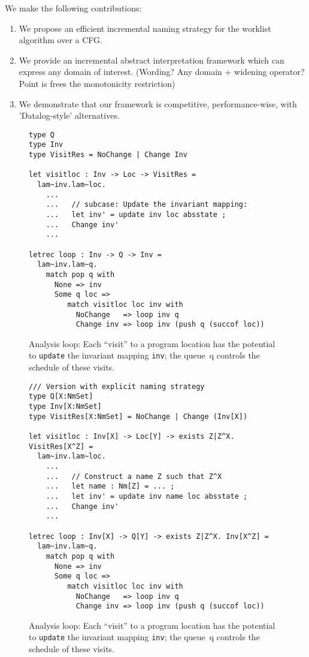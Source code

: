 \documentclass[acmlarge,anonymous]{acmart}\settopmatter{printfolios=true}
\newcommand{\code}[1]{\lstinline[basicstyle=\ttfamily]|#1|}
\begin{document}
We make the following contributions:

\begin{enumerate}
    \item We propose an efficient incremental naming strategy for the worklist algorithm over a CFG.
    \item We provide an incremental abstract interpretation framework which can express any domain of interest. (Wording? Any domain + widening operator? Point is frees the monotonicity restriction)
    \item We demonstrate that our framework is competitive, performance-wise, with 'Datalog-style' alternatives.
\end{enumerate}

\begin{figure}
\begin{lstlisting}
type Q
type Inv
type VisitRes = NoChange | Change Inv

let visitloc : Inv -> Loc -> VisitRes =
  lam~inv.lam~loc.
    ...
    ...   // subcase: Update the invariant mapping:
    ...   let inv' = update inv loc absstate ;
    ...   Change inv'
    ...

letrec loop : Inv -> Q -> Inv =
  lam~inv.lam~q.
    match pop q with
      None => inv
      Some q loc =>
         match visitloc loc inv with
           NoChange   => loop inv q
           Change inv => loop inv (push q (succof loc))    
\end{lstlisting}
\caption{Analysis loop: Each ``visit'' to a program location has the
  potential to \code{update} the invariant mapping \code{inv}; the
  queue~{q} controls the schedule of these visits. }
\end{figure}

\begin{figure}
\begin{lstlisting}
/// Version with explicit naming strategy
type Q[X:NmSet]
type Inv[X:NmSet]
type VisitRes[X:NmSet] = NoChange | Change (Inv[X])

let visitloc : Inv[X] -> Loc[Y] -> exists Z|Z^X. VisitRes[X^Z] =
  lam~inv.lam~loc.
    ...
    ...   // Construct a name Z such that Z^X
    ...   let name : Nm[Z] = ... ;
    ...   let inv' = update inv name loc absstate ;
    ...   Change inv'
    ...

letrec loop : Inv[X] -> Q[Y] -> exists Z|Z^X. Inv[X^Z] =
  lam~inv.lam~q.
    match pop q with
      None => inv
      Some q loc =>
         match visitloc loc inv with
           NoChange   => loop inv q
           Change inv => loop inv (push q (succof loc))
\end{lstlisting}
\caption{Analysis loop: Each ``visit'' to a program location has the
  potential to \code{update} the invariant mapping \code{inv}; the
  queue~{q} controls the schedule of these visits. }
\end{figure}
\end{document}

